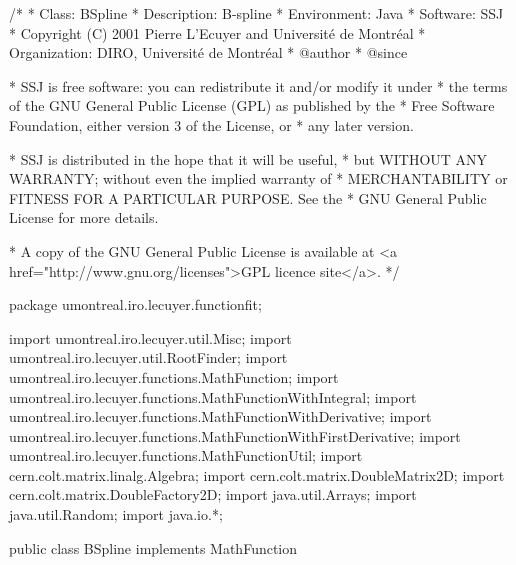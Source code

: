 \begin{code}
\begin{hide}
/*
 * Class:        BSpline
 * Description:  B-spline
 * Environment:  Java
 * Software:     SSJ 
 * Copyright (C) 2001  Pierre L'Ecuyer and Université de Montréal
 * Organization: DIRO, Université de Montréal
 * @author       
 * @since

 * SSJ is free software: you can redistribute it and/or modify it under
 * the terms of the GNU General Public License (GPL) as published by the
 * Free Software Foundation, either version 3 of the License, or
 * any later version.

 * SSJ is distributed in the hope that it will be useful,
 * but WITHOUT ANY WARRANTY; without even the implied warranty of
 * MERCHANTABILITY or FITNESS FOR A PARTICULAR PURPOSE.  See the
 * GNU General Public License for more details.

 * A copy of the GNU General Public License is available at
   <a href="http://www.gnu.org/licenses">GPL licence site</a>.
 */
\end{hide}
package umontreal.iro.lecuyer.functionfit;\begin{hide}

import umontreal.iro.lecuyer.util.Misc;
import umontreal.iro.lecuyer.util.RootFinder;
import umontreal.iro.lecuyer.functions.MathFunction;
import umontreal.iro.lecuyer.functions.MathFunctionWithIntegral;
import umontreal.iro.lecuyer.functions.MathFunctionWithDerivative;
import umontreal.iro.lecuyer.functions.MathFunctionWithFirstDerivative;
import umontreal.iro.lecuyer.functions.MathFunctionUtil;
import cern.colt.matrix.linalg.Algebra;
import cern.colt.matrix.DoubleMatrix2D;
import cern.colt.matrix.DoubleFactory2D;
import java.util.Arrays;
import java.util.Random;
import java.io.*;
\end{hide}

public class BSpline implements MathFunction\begin{hide}

,
MathFunctionWithIntegral, MathFunctionWithDerivative, MathFunctionWithFirstDerivative{
   // Formula taken from http://www.ibiblio.org/e-notes/Splines/Basis.htm
   // and http://en.wikipedia.org/wiki/De_Boor_algorithm
   private double[] x;     //x original
   private double[] y;     //y original

   private int degree;

   //variables sur lesquelles on travaille
   private double[] myX;
   private double[] myY;
   private double[] knots;
\end{hide}
\end{code}

